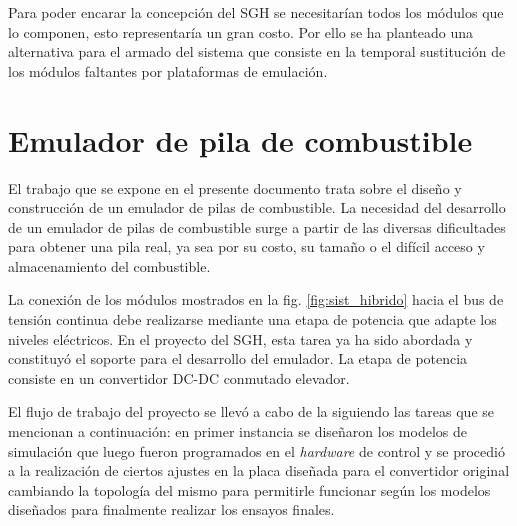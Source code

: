 Para poder encarar la concepción del SGH se necesitarían todos los módulos que lo componen, esto representaría un gran costo. Por ello se ha
planteado una alternativa para el armado del sistema que consiste en la temporal sustitución de los módulos faltantes por plataformas de emulación.

\section{Emulador de pila de combustible}
El trabajo que se expone en el presente documento trata sobre el diseño y construcción de un emulador de pilas de combustible.
La necesidad del desarrollo de un emulador de pilas de combustible surge a partir de las diversas dificultades para obtener una pila
real, ya sea por su costo, su tamaño o el difícil acceso y almacenamiento del combustible.

La conexión de los módulos mostrados en la fig. \ref{fig:sist_hibrido} hacia el bus de tensión continua debe realizarse mediante una etapa de potencia 
que adapte los niveles eléctricos. En el proyecto del SGH, esta tarea ya ha sido abordada y constituyó el soporte para el desarrollo del emulador. 
La etapa de potencia consiste en un convertidor DC-DC conmutado elevador.

El flujo de trabajo del proyecto se llevó a cabo  de la siguiendo las tareas que se mencionan a continuación: en primer instancia se diseñaron los modelos
de simulación que luego fueron programados en el \emph{hardware} de control y se procedió a la realización de ciertos ajustes en la placa diseñada para el 
convertidor original cambiando la topología del mismo para permitirle funcionar según los modelos diseñados para finalmente realizar los ensayos finales.
